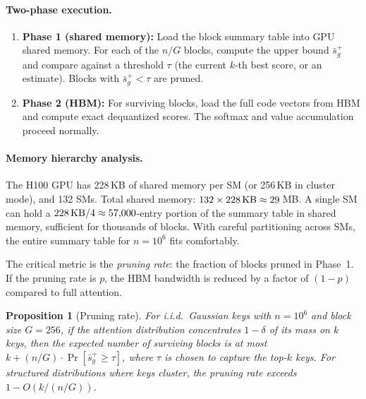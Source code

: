 \documentclass[10pt,twocolumn]{article}
\newtheorem{proposition}[theorem]{Proposition}
\theoremstyle{definition}
\begin{document}
\paragraph{Two-phase execution.}
\begin{enumerate}[nosep]
  \item \textbf{Phase 1 (shared memory):} Load the block summary table into GPU
        shared memory.  For each of the $n/G$ blocks, compute the upper bound
        $\bar{s}_g^+$ and compare against a threshold $\tau$ (the current $k$-th
        best score, or an estimate).  Blocks with $\bar{s}_g^+ < \tau$ are
        pruned.
  \item \textbf{Phase 2 (HBM):} For surviving blocks, load the full code
        vectors from HBM and compute exact dequantized scores.  The softmax
        and value accumulation proceed normally.
\end{enumerate}

\paragraph{Memory hierarchy analysis.}
The H100 GPU has 228\,KB of shared memory per SM (or 256\,KB in cluster mode),
and 132 SMs.  Total shared memory: $132 \times 228\text{\,KB} \approx 29$\,MB.
A single SM can hold a $228\text{\,KB} / 4 \approx 57{,}000$-entry portion of
the summary table in shared memory, sufficient for thousands of blocks.  With
careful partitioning across SMs, the entire summary table for $n = 10^6$ fits
comfortably.

The critical metric is the \emph{pruning rate}: the fraction of blocks pruned
in Phase~1.  If the pruning rate is $p$, the HBM bandwidth is reduced by a
factor of $(1-p)$ compared to full attention.

\begin{proposition}[Pruning rate]
  \label{prop:pruning_rate}
  For i.i.d.\ Gaussian keys with $n = 10^6$ and block size $G = 256$, if the
  attention distribution concentrates $1 - \delta$ of its mass on $k$ keys,
  then the expected number of surviving blocks is at most $k + (n/G) \cdot
  \Pr[\bar{s}_g^+ \geq \tau]$, where $\tau$ is chosen to capture the top-$k$
  keys.  For structured distributions where keys cluster, the pruning rate
  exceeds $1 - O(k / (n/G))$.
\end{proposition}

\end{document}
